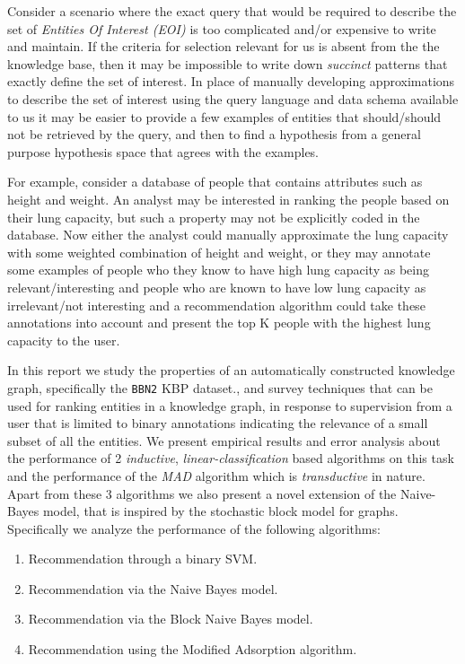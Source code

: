 \documentclass[paper=a4,fontsize=11pt]{scrartcl}
\numberwithin{equation}{section}    %
\numberwithin{figure}{section}      %
\numberwithin{table}{section}       %
\newcommand{\dataset}[0]{\texttt{BBN2} KBP dataset.}
\begin{document}
\begin{example}\label{ex:use-case-2}
  Consider a scenario where the exact query that would be required to describe the
set of \textit{Entities Of Interest (EOI)} is too complicated and/or expensive
to write and maintain. If the criteria for selection relevant for us is
absent from the the knowledge base, then it may be impossible to write
down \textit{succinct} patterns that exactly define the set of interest.
In place of manually developing approximations to describe the set of interest
using the query language and data schema available to us it may be
easier to provide a few examples of entities that should/should not
be retrieved by the query, and then to find a hypothesis from a general purpose
hypothesis space that agrees with the examples.

For example, consider a database of people that contains attributes such as height
and weight. An analyst may be interested in ranking the people based on their lung
capacity, but such a property may not be explicitly coded in the database.
Now either the analyst could manually approximate the lung capacity with some weighted
combination of height and weight, or they may annotate some examples of people who they
know to have high lung capacity as being relevant/interesting
and people who are known to have low lung capacity as irrelevant/not interesting
and a recommendation algorithm could take these annotations into account and present
the top K people with the highest lung capacity to the user.
\end{example}

In this report we study the properties of an automatically constructed knowledge
graph, specifically the \dataset, and survey techniques that can be used for
ranking entities in a knowledge graph, in response to supervision from a user
that is limited to binary annotations indicating the relevance of a small subset
of all the entities. We present empirical results and error analysis
about the performance of 2 \textit{inductive}, \textit{linear-classification}
based algorithms on this task and the performance of the \textit{MAD} algorithm
which is \textit{transductive} in nature. Apart from these 3 algorithms we also
present a novel extension of the Naive-Bayes model, that is inspired by the
stochastic block model for graphs. Specifically we analyze the performance of
the following algorithms:
\begin{snugshade}
\begin{enumerate}
\item Recommendation through a binary SVM.
\item Recommendation via the Naive Bayes model.
\item Recommendation via the Block Naive Bayes model.
\item Recommendation using the Modified Adsorption algorithm.
\end{enumerate}
\end{snugshade}
\end{document}
